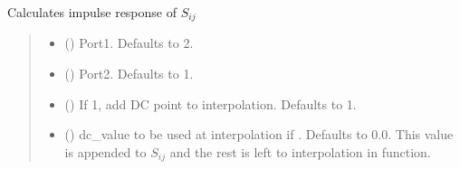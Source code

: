 \documentclass[letterpaper,10pt,english]{sphinxmanual}
\begin{document}
\begin{fulllineitems}
\begin{fulllineitems}
\label{\detokenize{touchstone:touchstone.spfile.ImpulseResponse}}
\pysigstartsignatures
{}
\pysigstopsignatures
\sphinxAtStartPar
Calculates impulse response of \(S_{i j}\)
\begin{quote}\begin{description}
\begin{itemize}
\item {}
\sphinxAtStartPar
{} (\sphinxstyleliteralemphasis{\sphinxupquote{, }}) \textendash{} Port\sphinxhyphen{}1. Defaults to 2.

\item {}
\sphinxAtStartPar
{} (\sphinxstyleliteralemphasis{\sphinxupquote{, }}) \textendash{} Port\sphinxhyphen{}2. Defaults to 1.

\item {}
\sphinxAtStartPar
{} (\sphinxstyleliteralemphasis{\sphinxupquote{, }}) \textendash{} If 1, add DC point to interpolation. Defaults to 1.

\item {}
\sphinxAtStartPar
{} (\sphinxstyleliteralemphasis{\sphinxupquote{, }}) \textendash{} dc\_value to be used at interpolation if . Defaults to 0.0. This value is appended to \(S_{i j}\) and the rest is left to interpolation in  function.


\end{itemize}
\end{description}
\end{quote}
\end{fulllineitems}
\end{fulllineitems}
\end{document}
